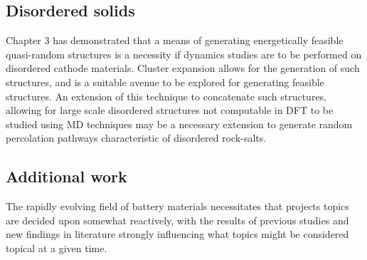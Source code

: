 \subsection{Disordered solids}
Chapter 3 has demonstrated that a means of generating energetically feasible quasi-random structures is a necessity if dynamics studies are to be performed on disordered cathode materials.
Cluster expansion\cite{Chang2019} allows for the generation of such structures, and is a suitable avenue to be explored for generating feasible structures.
An extension of this technique to concatenate such structures, allowing for large scale disordered structures not computable in DFT to be studied using MD techniques may be a necessary extension to generate random percolation pathways characteristic of disordered rock-salts.

\subsection{Additional work}
The rapidly evolving field of battery materials necessitates that projects topics are decided upon somewhat reactively, with the results of previous studies and new findings in literature strongly influencing what topics might be considered topical at a given time.

